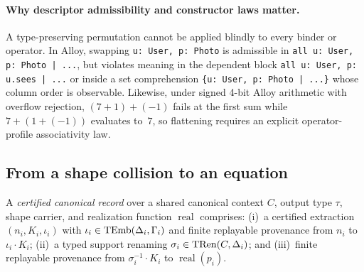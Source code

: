 \paragraph{Why descriptor admissibility and constructor laws matter.}
A type-preserving permutation cannot be applied blindly to every binder or
operator. In Alloy, swapping \texttt{u: User, p: Photo} is admissible in
\texttt{all u: User, p: Photo | ...}, but violates meaning in the dependent
block \texttt{all u: User, p: u.sees | ...} or inside a set comprehension
\texttt{\{u: User, p: Photo | ...\}} whose column order is observable.
Likewise, under signed 4-bit Alloy arithmetic with overflow rejection,
$(7+1)+(-1)$ fails at the first sum while $7+(1+(-1))$ evaluates to~$7$, so
flattening requires an explicit operator-profile associativity law.

\subsection{From a shape collision to an equation}

A \emph{certified canonical record} over a shared canonical context $C$, output
type $\tau$, shape carrier, and realization function $\operatorname{real}$
comprises: (i)~a certified extraction $(n_i,K_i,\iota_i)$ with
$\iota_i\in\operatorname{TEmb}(\Delta_i,\Gamma_i)$ and finite replayable provenance from
$n_i$ to $\iota_i\cdot K_i$; (ii)~a typed support renaming
$\sigma_i\in\operatorname{TRen}(C,\Delta_i)$; and (iii)~finite replayable provenance from
$\sigma_i^{-1}\cdot K_i$ to $\operatorname{real}(p_i)$.

